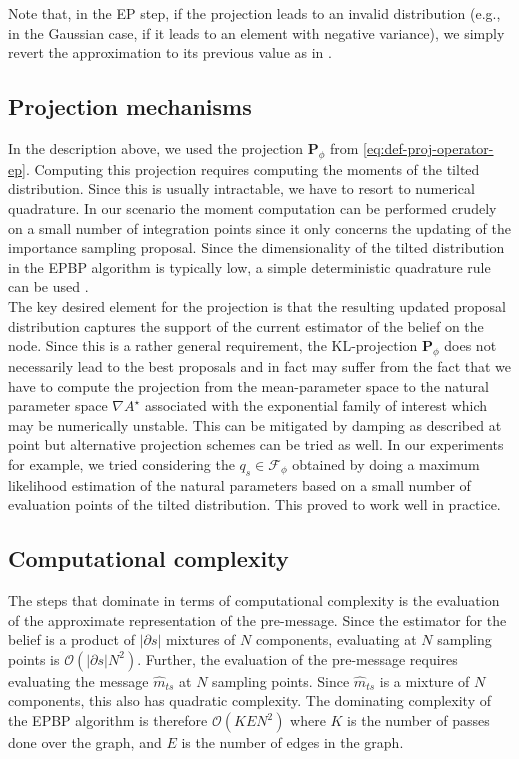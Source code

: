 Note that, in the EP step, if the projection leads to an invalid distribution (e.g., in the Gaussian case, if it leads to an element with negative variance), we simply revert the approximation to its previous value as in \citet{minka01}. 

\subsection{\label{point:epbp-proj}Projection mechanisms}

In the description above, we used the projection $\mathbf P_{\phi}$ from \ref{eq:def-proj-operator-ep}. 
Computing this projection requires computing the moments of the tilted distribution. 
Since this is usually intractable, we have to resort to numerical quadrature. 
In our scenario the moment computation can be performed crudely on a small number of integration points since it only concerns the updating of the importance sampling proposal. 
Since the dimensionality of the tilted distribution in the EPBP algorithm is typically low, a simple deterministic quadrature rule can be used \citep{davis75}. \\

The key desired element for the projection is that the resulting updated proposal distribution captures the support of the current estimator of the belief on the node. Since this is a rather general requirement, the KL-projection $\mathbf P_{\phi}$ does not necessarily lead to the best proposals and in fact may suffer from the fact that we have to compute the projection from the mean-parameter space to the natural parameter space $\nabla A^{\star}$ associated with the exponential family of interest which may be numerically unstable.  
This can be mitigated by damping as described at point  but alternative projection schemes can be tried as well.
In our experiments for example, we tried considering the $q_{s}\in\mathcal F_{\phi}$ obtained by doing a maximum likelihood estimation of the natural parameters based on a small number of evaluation points of the tilted distribution. This proved to work well in practice.

\subsection{\label{sec:EPBP-compcompl}Computational complexity}
The steps that dominate in terms of computational complexity is the evaluation of the approximate representation of the pre-message.
Since the estimator for the belief is a product of $|\partial s|$ mixtures of $N$ components, evaluating at $N$ sampling points is $\mathcal O(|\partial s|N^{2})$. 
Further, the evaluation of the pre-message requires evaluating the message $\widehat m_{ts}$ at $N$ sampling points. Since $\widehat m_{ts}$ is a mixture of $N$ components, this also has quadratic complexity. The dominating complexity of the EPBP algorithm is therefore $\mathcal O(KEN^{2})$ where $K$ is the number of passes done over the graph, and $E$ is the number of edges in the graph.

